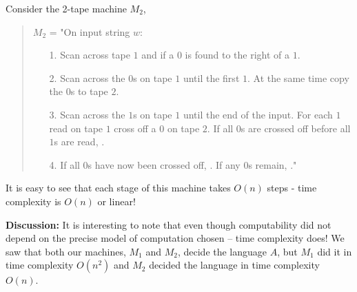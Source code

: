\documentclass[a4paper,blends,pdf,colorBG,slideColor]{prosper}
\begin{document}
{\small
Consider the 2-tape machine $M_2$,
\begin{quote}
$M_2$ = "On input string $w$:
\begin{itemize}
\item[1.] Scan across tape $1$ and \reject if a $0$ is found to the right
of a $1$.
\item[2.] Scan across the $0$s on tape $1$ until the first $1$.  At the same time
copy the $0$s to tape $2$.
\item[3.] Scan across the $1$s on tape $1$ until the end of the input.
For each $1$ read on tape $1$ cross off a $0$ on tape $2$. If all $0$s
are crossed off before all $1$s are read, \reject.
\item[4.] If all $0$s have now been crossed off, \accept. If any $0$s remain, \reject."
\end{itemize}
\end{quote}
It is easy to see that each stage of this machine takes $O(n)$ steps - time complexity is $O(n)$
or linear!

{\bf Discussion:}  It is interesting to note that even though computability did not depend
on the precise model of computation chosen -- time complexity does! We saw that both our
machines, $M_1$ and $M_2$, decide the language $A$, but $M_1$ did it in time complexity
$O(n^2)$ and $M_2$ decided the language in time complexity $O(n)$.
}

\es
\end{document}
